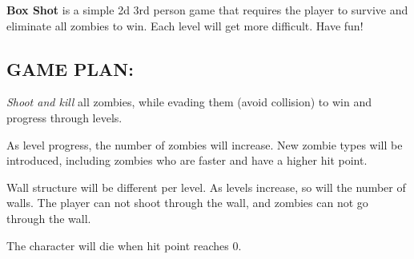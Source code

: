 {\bfseries Box Shot} is a simple 2d 3rd person game that requires the player to survive and eliminate all zombies to win. Each level will get more difficult. Have fun!

\subsection*{G\+A\+ME P\+L\+AN\+:}


\begin{DoxyEnumerate}
\item {\itshape Shoot and kill} all zombies, while evading them (avoid collision) to win and progress through levels.
\item As level progress, the number of zombies will increase. New zombie types will be introduced, including zombies who are faster and have a higher hit point.
\item Wall structure will be different per level. As levels increase, so will the number of walls. The player can not shoot through the wall, and zombies can not go through the wall.
\item The character will die when hit point reaches 0. 
\end{DoxyEnumerate}